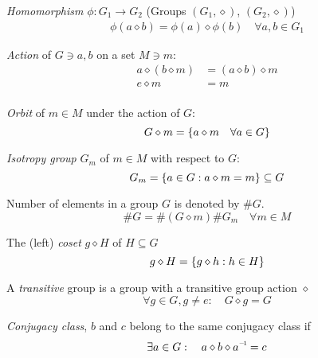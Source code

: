 		\noindent
		\emph{Homomorphism} $\phi: G_1 \to G_2$ (Groups $(G_1,\diamond)$, $(G_2,\diamond)$)
		\begin{equation}
			\begin{aligned}
				\phi(a \diamond b) = \phi(a) \diamond \phi(b) \quad \forall a,b \in G_1
			\end{aligned}
		\end{equation}

		\noindent
		\emph{Action} of $G\ni a, b$ on a set $M\ni m$:
		\begin{equation}
			\begin{aligned}
				a\diamond (b\diamond m) &= (a \diamond b) \diamond m \\
				e \diamond m &= m \\
			\end{aligned}
		\end{equation}

		\noindent
		\emph{Orbit} of $m\in M$ under the action of $G$:
		\begin{equation}
			G \diamond m = \qty{ a\diamond m \quad \forall a \in G}
		\end{equation}

		\noindent
		\emph{Isotropy group} $G_m$ of $m\in M$ with respect to $G$:
		\begin{equation}
			G_m = \qty{a\in G: a\diamond m = m} \subseteq{G}
		\end{equation}

		\noindent
		Number of elements in a group $G$ is denoted by $\# G$.
		\begin{equation}
			\# G = \#(G \diamond m) \#G_m \quad \forall m \in M
		\end{equation}

		\noindent
		The (left) \emph{coset} $g \diamond H$ of $H \subseteq G$
		\begin{equation}
			g \diamond H = \qty{g\diamond h: h\in H}
		\end{equation}

		\noindent
		A \emph{transitive} group is a group with a transitive group action $\diamond$
		\begin{equation}
			\forall g \in G, g \ne e: \quad G \diamond g = G
		\end{equation}

		\noindent
		\emph{Conjugacy class}, $b$ and $c$ belong to the same conjugacy class if
		\begin{equation}
			\exists a \in G: \quad a \diamond b \diamond \inv{a} = c
		\end{equation}

